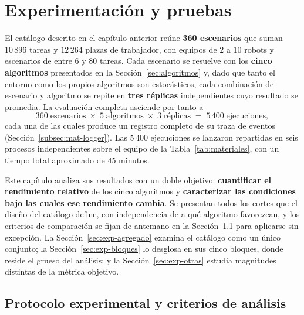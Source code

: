 \chapter{Experimentación y pruebas}\label{cap:experimentacion_pruebas}

El catálogo descrito en el capítulo anterior reúne \textbf{360 escenarios} que suman $10\,896$ tareas y $12\,264$ plazas de trabajador, con equipos de $2$ a $10$ robots y escenarios de entre $6$ y $80$ tareas. Cada escenario se resuelve con los \textbf{cinco algoritmos} presentados en la Sección~\ref{sec:algoritmos} y, dado que tanto el entorno como los propios algoritmos son estocásticos, cada combinación de escenario y algoritmo se repite en \textbf{tres réplicas} independientes cuyo resultado se promedia. La evaluación completa asciende por tanto a
\begin{equation} \label{eq:ejecuciones}
    360 \;\text{escenarios} \;\times\; 5 \;\text{algoritmos} \;\times\; 3 \;\text{réplicas} \;=\; 5\,400 \;\text{ejecuciones},
\end{equation}
cada una de las cuales produce un registro completo de su traza de eventos (Sección~\ref{subsec:mat-logger}). Las $5\,400$ ejecuciones se lanzaron repartidas en seis procesos independientes sobre el equipo de la Tabla~\ref{tab:materiales}, con un tiempo total aproximado de $45$ minutos.

Este capítulo analiza sus resultados con un doble objetivo: \textbf{cuantificar el rendimiento relativo} de los cinco algoritmos y \textbf{caracterizar las condiciones bajo las cuales ese rendimiento cambia}. Se presentan todos los cortes que el diseño del catálogo define, con independencia de a qué algoritmo favorezcan, y los criterios de comparación se fijan de antemano en la Sección~\ref{sec:exp-protocolo} para aplicarse sin excepción. La Sección~\ref{sec:exp-agregado} examina el catálogo como un único conjunto; la Sección~\ref{sec:exp-bloques} lo desglosa en sus cinco bloques, donde reside el grueso del análisis; y la Sección~\ref{sec:exp-otras} estudia magnitudes distintas de la métrica objetivo.

\section{Protocolo experimental y criterios de análisis} \label{sec:exp-protocolo}

